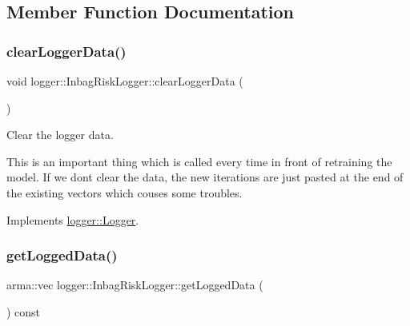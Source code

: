 \subsection{Member Function Documentation}
\mbox{\label{classlogger_1_1_inbag_risk_logger_aecdde2764203ec24ca360846538ce3c6}} 
\subsubsection{\texorpdfstring{clear\+Logger\+Data()}{clearLoggerData()}}
{\footnotesize\ttfamily void logger\+::\+Inbag\+Risk\+Logger\+::clear\+Logger\+Data (\begin{DoxyParamCaption}{ }\end{DoxyParamCaption})\hspace{0.3cm}{\ttfamily [virtual]}}



Clear the logger data. 

This is an important thing which is called every time in front of retraining the model. If we don\textquotesingle{}t clear the data, the new iterations are just pasted at the end of the existing vectors which couses some troubles. 

Implements \hyperlink{classlogger_1_1_logger_a8c68db2430fa84b67528bfa6ae45a516}{logger\+::\+Logger}.

\mbox{\label{classlogger_1_1_inbag_risk_logger_af69f22c25521341a26152692bd03183a}} 
\subsubsection{\texorpdfstring{get\+Logged\+Data()}{getLoggedData()}}
{\footnotesize\ttfamily arma\+::vec logger\+::\+Inbag\+Risk\+Logger\+::get\+Logged\+Data (\begin{DoxyParamCaption}{ }\end{DoxyParamCaption}) const\hspace{0.3cm}{\ttfamily [virtual]}}



